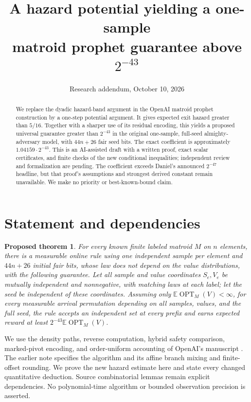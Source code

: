 \documentclass[11pt]{article}
\title{A hazard potential yielding a one-sample\protect\\matroid prophet guarantee above $2^{-43}$}
\author{}
\date{Research addendum, October 10, 2026}
\newtheorem{theorem}{Proposed theorem}
\DeclareMathOperator{\OPT}{OPT}
\newcommand{\E}{\mathbb E}
\begin{document}
\maketitle
\begin{abstract}
We replace the dyadic hazard-band argument in the OpenAI matroid prophet
construction by a one-step potential argument. It gives expected exit hazard
greater than $5/16$. Together with a sharper use of its residual encoding,
this yields a proposed universal guarantee greater than $2^{-43}$ in the
original one-sample, full-seed almighty-adversary model, with $44n+26$ fair
seed bits. The exact coefficient is approximately $1.04159\cdot2^{-43}$.
This is an AI-assisted draft with a written proof, exact scalar certificates,
and finite checks of the new conditional inequalities; independent review
and formalization are pending. The coefficient exceeds Daniel's announced
$2^{-47}$ headline, but that proof's assumptions and strongest derived
constant remain unavailable. We make no priority or best-known-bound claim.
\end{abstract}

\section{Statement and dependencies}

\begin{theorem}
For every known finite labeled matroid $M$ on $n$ elements, there is a
measurable online rule using one independent sample per element and
$44n+26$ initial fair bits, whose law does not depend on the value
distributions, with the following guarantee. Let all sample and value
coordinates $S_e,V_e$ be mutually independent and nonnegative, with
matching laws at each label; let the seed be independent of these
coordinates. Assuming only $\E\OPT_M(V)<\infty$, for every measurable
arrival permutation depending on all samples, values, and the full seed,
the rule accepts an independent set at every prefix and earns expected
reward at least $2^{-43}\E\OPT_M(V)$.
\end{theorem}

We use the density paths, reverse computation, hybrid safety comparison,
marked-pivot encoding, and order-uniform accounting of OpenAI's manuscript
\cite{source}. The earlier note \cite{previous} specifies the algorithm and
its affine branch mixing and finite-offset rounding. We prove the new
hazard estimate here and state every changed quantitative deduction.
Source combinatorial lemmas remain explicit dependencies. No polynomial-time
algorithm or bounded observation precision is asserted.
\end{document}
